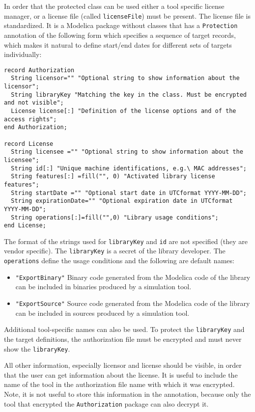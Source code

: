 In order that the protected class can be used either a tool specific
license manager, or a license file (called \lstinline!licenseFile!) must be
present. The license file is standardized. It is a Modelica package
without classes that has a \lstinline!Protection! annotation of the following form
which specifies a sequence of target records, which makes it natural to
define start/end dates for different sets of targets individually:
\begin{lstlisting}[language=modelica]
record Authorization
  String licensor="" "Optional string to show information about the licensor";
  String libraryKey "Matching the key in the class. Must be encrypted and not visible";
  License license[:] "Definition of the license options and of the access rights";
end Authorization;

record License
  String licensee ="" "Optional string to show information about the licensee";
  String id[:] "Unique machine identifications, e.g.\ MAC addresses";
  String features[:] =fill("", 0) "Activated library license features";
  String startDate ="" "Optional start date in UTCformat YYYY-MM-DD";
  String expirationDate="" "Optional expiration date in UTCformat YYYY-MM-DD";
  String operations[:]=fill("",0) "Library usage conditions";
end License;
\end{lstlisting}

The format of the strings used for \lstinline!libraryKey! and \lstinline!id! are not specified
(they are vendor specific). The \lstinline!libraryKey! is a secret of the library
developer. The \lstinline!operations! define the usage conditions and the following
are default names:
\begin{itemize}
\item
  \lstinline!"ExportBinary"! Binary code generated from the Modelica code of the
  library can be included in binaries produced by a simulation
  tool.
\item
  \lstinline!"ExportSource"! Source code generated from the Modelica code of the
  library can be included in sources produced by a simulation tool.
\end{itemize}

Additional tool-specific names can also be used. To protect the
\lstinline!libraryKey! and the target definitions, the authorization file must
be encrypted and must never show the \lstinline!libraryKey!.

\begin{nonnormative}
All other information, especially licensor and license should be visible, in order
that the user can get information about the license. It is useful to
include the name of the tool in the authorization file name with which
it was encrypted. Note, it is not useful to store this information in
the annotation, because only the tool that encrypted the \lstinline!Authorization!
package can also decrypt it.
\end{nonnormative}

